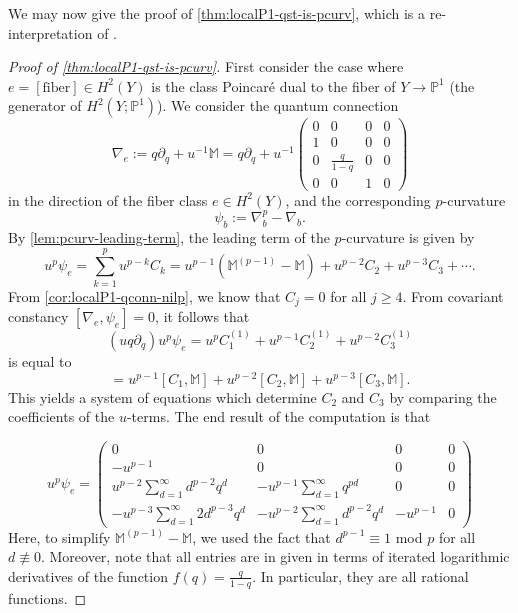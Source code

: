 \documentclass[reqno]{amsart}
\numberwithin{equation}{section}
\numberwithin{equation}{section}
\numberwithin{equation}{section}
\theoremstyle{definition}
\theoremstyle{remark}
\theoremstyle{remark}
\begin{document}
We may now give the proof of \cref{thm:localP1-qst-is-pcurv}, which is a re-interpretation of \cite[Corollary 4.16]{Lee23a}.

\begin{proof}[Proof of \cref{thm:localP1-qst-is-pcurv}]
First consider the case where $e =[\mathrm{fiber}] \in H^2(Y)$ is the class Poincar\'e dual to the fiber of $Y \to \mathbb{P}^1$ (the generator of $H^2(Y;\mathbb{P}^1)$). We consider the quantum connection
\begin{equation}
    \nabla_e :=  q \partial_q + u^{-1} \mathbb{M} =  q\partial_q + u^{-1} \begin{pmatrix} 0 & 0 & 0 & 0 \\ 1 & 0 & 0 & 0 \\ 0 & \frac{q}{1-q} & 0 & 0 \\ 0 & 0& 1& 0 \end{pmatrix}
\end{equation}
in the direction of the fiber class $e \in H^2(Y)$, and the corresponding $p$-curvature
\begin{equation}
    \psi_b:= \nabla_b^p - \nabla_b.
\end{equation}
By \cref{lem:pcurv-leading-term}, the leading term of the $p$-curvature is given by
\begin{equation}
    u^p\psi_e = \sum_{k=1}^{p} u^{p-k} C_k = u^{p-1} \left( \mathbb{M}^{(p-1)} - \mathbb{M} \right) + u^{p-2} C_2 + u^{p-3} C_3 + \cdots.
\end{equation}
From \cref{cor:localP1-qconn-nilp}, we know that $C_j = 0$ for all $j \ge 4$. From covariant constancy $[\nabla_e, \psi_e] = 0$, it follows that
\begin{equation}
    (u q\partial_q ) u^p \psi_e = u^p C_1^{(1)} + u^{p-1} C_2^{(1)} + u^{p-2} C_3^{(1)}
\end{equation}
is equal to
\begin{equation}
    [u^p\psi_e, \mathbb{M}] = u^{p-1} [C_1, \mathbb{M}] + u^{p-2}[C_2, \mathbb{M}] + u^{p-3}[C_3, \mathbb{M}].
\end{equation}
This yields a system of equations which determine $C_2$ and $C_3$ by comparing the coefficients of the $u$-terms. The end result of the computation is that

\begin{equation}\label{eqn:localP1-pcurv-formula}
    u^p\psi_e = \begin{pmatrix}
        0 & 0 & 0 & 0 \\
        - u^{p-1} & 0 & 0 & 0 \\
        u^{p-2}\sum_{d=1}^\infty d^{p-2}q^d & -u^{p-1}\sum_{d=1}^\infty  q^{pd} & 0 & 0  \\ -u^{p-3} \sum_{d=1}^\infty 2 d^{p-3} q^d & - u^{p-2}\sum_{d=1}^\infty d^{p-2}q^d & -u^{p-1} & 0 
    \end{pmatrix}
\end{equation}
Here, to simplify $\mathbb{M}^{(p-1)}- \mathbb{M}$, we used the fact that $d^{p-1} \equiv 1$ mod $p$ for all $d \not \equiv 0$. Moreover, note that all entries are in given in terms of iterated logarithmic derivatives of the function $f(q) = \frac{q}{1-q}$. In particular, they are all rational functions.


\end{proof}
\end{document}
